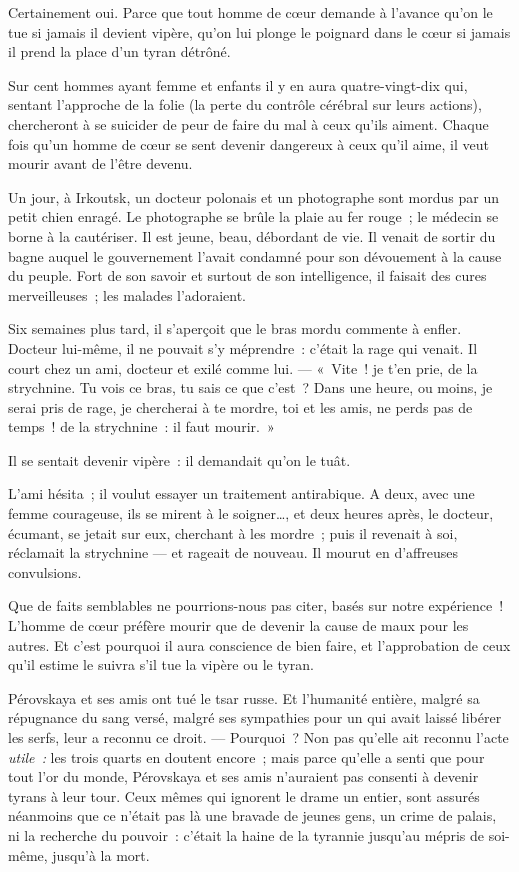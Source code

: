 \documentclass[french,twoside]{book} %
\begin{document}
Certainement oui. Parce que tout homme de cœur demande à l’avance qu’on le tue si jamais il devient vipère, qu’on lui plonge le poignard dans le cœur si jamais il prend la place d’un tyran détrôné.\par
\bigbreak
\noindent Sur cent hommes ayant femme et enfants il y en aura quatre-vingt-dix qui, sentant l’approche de la folie (la perte du contrôle cérébral sur leurs actions), chercheront à se suicider de peur de faire du mal à ceux qu’ils aiment. Chaque fois qu’un homme de cœur se sent devenir dangereux à ceux qu’il aime, il veut mourir avant de l’être devenu.\par
Un jour, à Irkoutsk, un docteur polonais et un photographe sont mordus par un petit chien enragé. Le photographe se brûle la plaie au fer rouge ; le médecin se borne à la cautériser. Il est jeune, beau, débordant de vie. Il venait de sortir du bagne auquel le gouvernement l’avait condamné pour son dévouement à la cause du peuple. Fort de son savoir et surtout de son intelligence, il faisait des cures merveilleuses ; les malades l’adoraient.\par
Six semaines plus tard, il s’aperçoit que le bras mordu commente à enfler. Docteur lui-même, il ne pouvait s’y méprendre : c’était la rage qui venait. Il court chez un ami, docteur et exilé comme lui. — « Vite ! je t’en prie, de la strychnine. Tu vois ce bras, tu sais ce que c’est ? Dans une heure, ou moins, je serai pris de rage, je chercherai à te mordre, toi et les amis, ne perds pas de temps ! de la strychnine : il faut mourir. »\par
Il se sentait devenir vipère : il demandait qu’on le tuât.\par
L’ami hésita ; il voulut essayer un traitement antirabique. A deux, avec une femme courageuse, ils se mirent à le soigner…, et deux heures après, le docteur, écumant, se jetait sur eux, cherchant à les mordre ; puis il revenait à soi, réclamait la strychnine — et rageait de nouveau. Il mourut en d’affreuses convulsions.\par
Que de faits semblables ne pourrions-nous pas citer, basés sur notre expérience ! L’homme de cœur préfère mourir que de devenir la cause de maux pour les autres. Et c’est pourquoi il aura conscience de bien faire, et l’approbation de ceux qu’il estime le suivra s’il tue la vipère ou le tyran.\par
\bigbreak
\noindent Pérovskaya et ses amis ont tué le tsar russe. Et l’humanité entière, malgré sa répugnance du sang versé, malgré ses sympathies pour un qui avait laissé libérer les serfs, leur a reconnu ce droit. — Pourquoi ? Non pas qu’elle ait reconnu l’acte \emph{utile :} les trois quarts en doutent  encore ; mais parce qu’elle a senti que pour tout l’or du monde, Pérovskaya et ses amis n’auraient pas consenti à devenir tyrans à leur tour. Ceux mêmes qui ignorent le drame un entier, sont assurés néanmoins que ce n’était pas là une bravade de jeunes gens, un crime de palais, ni la recherche du pouvoir : c’était la haine de la tyrannie jusqu’au mépris de soi-même, jusqu’à la mort.\par
\end{document}
